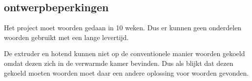 \subsection{ontwerpbeperkingen}

Het project moet woorden gedaan in 10 weken. Dus er kunnen geen onderdelen
woorden gebruikt met een lange levertijd.

De extruder en hotend kunnen niet op de conventionele manier woorden gekoeld
omdat dezen zich in de verwarmde kamer bevinden. Dus als blijkt dat dezen
gekoeld moeten woorden moet daar een andere oplossing voor woorden gevonden.